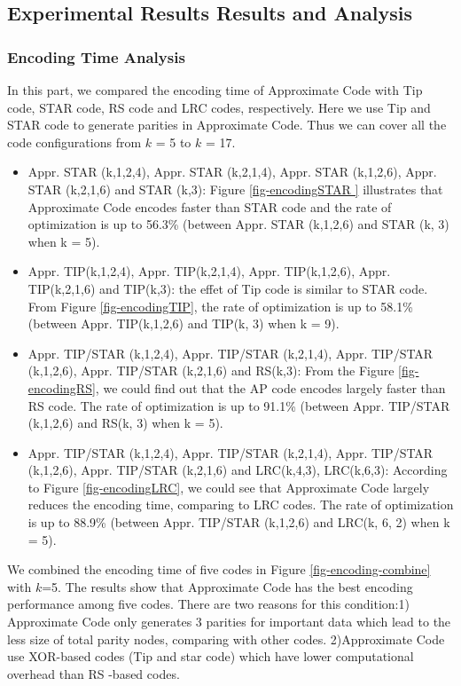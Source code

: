 \documentclass[sigconf]{acmart}
\begin{document}
\subsection{Experimental Results Results and Analysis}

\subsubsection{Encoding Time Analysis}
In this part, we compared the encoding time of Approximate Code with Tip code, STAR code, RS code and LRC codes, respectively. Here we use Tip and STAR code to generate parities in Approximate Code. Thus we can cover all the code configurations from $k$ = 5 to $k$ = 17. 
\begin{itemize}
    \item Appr.  STAR (k,1,2,4), Appr. STAR (k,2,1,4), Appr. STAR (k,1,2,6), Appr.  STAR (k,2,1,6) and STAR (k,3): Figure \ref{fig-encodingSTAR } illustrates that Approximate Code encodes faster than STAR code and the rate of optimization is up to 56.3\% (between Appr.  STAR (k,1,2,6) and STAR (k, 3) when k = 5). 
    \item Appr.  TIP(k,1,2,4), Appr.  TIP(k,2,1,4), Appr.  TIP(k,1,2,6), Appr.  TIP(k,2,1,6) and TIP(k,3): the effet of Tip code is similar to STAR  code. From Figure \ref{fig-encodingTIP}, the rate of optimization is up to 58.1\% (between Appr.  TIP(k,1,2,6) and TIP(k, 3) when k = 9).
    \item Appr.  TIP/STAR (k,1,2,4), Appr. TIP/STAR (k,2,1,4), Appr.  TIP/STAR (k,1,2,6), Appr.  TIP/STAR (k,2,1,6) and RS(k,3): From the Figure \ref{fig-encodingRS}, we could find out that the AP code encodes largely faster than RS code. The rate of optimization is up to 91.1\% (between Appr.  TIP/STAR (k,1,2,6) and RS(k, 3) when k = 5).
    \item Appr.  TIP/STAR (k,1,2,4), Appr.  TIP/STAR (k,2,1,4), Appr.  TIP/STAR (k,1,2,6), Appr.  TIP/STAR (k,2,1,6) and LRC(k,4,3), LRC(k,6,3):  According to Figure \ref{fig-encodingLRC}, we could see that Approximate Code largely reduces the encoding time, comparing to LRC codes. The rate of optimization is up to 88.9\% (between Appr.  TIP/STAR (k,1,2,6) and LRC(k, 6, 2) when k = 5).
\end{itemize}

We combined the encoding time of five codes in Figure \ref{fig-encoding-combine} with $k$=5. The results show that Approximate Code has the best encoding performance among five codes. There are two reasons for this condition:1) Approximate Code only generates 3 parities for important data which lead to the less size of total parity nodes, comparing with other codes. 2)Approximate Code use XOR-based codes (Tip and star code) which have lower computational overhead than RS -based codes.\par
\end{document}

